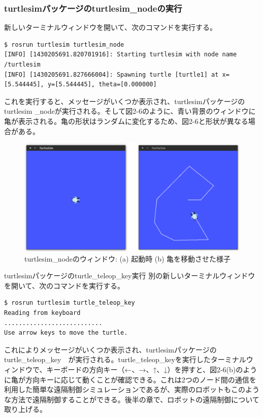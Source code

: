 \subsubsection{turtlesimパッケージのturtlesim\_nodeの実行}

新しいターミナルウィンドウを開いて、次のコマンドを実行する。

\begin{lstlisting}[language=ROS]
$ rosrun turtlesim turtlesim_node
[INFO] [1430205691.820701916]: Starting turtlesim with node name /turtlesim
[INFO] [1430205691.827666004]: Spawning turtle [turtle1] at x=[5.544445], y=[5.544445], theta=[0.000000]
\end{lstlisting}

これを実行すると、メッセージがいくつか表示され、turtlesimパッケージのturtlesim \_nodeが実行される。そして図2-6のように、青い背景のウィンドウに亀が表示される。亀の形状はランダムに変化するため、図2-6と形状が異なる場合がある。

\begin{figure}[h]
  \centering
  \includegraphics[width=0.9\columnwidth]{pictures/chapter2/pic_02_03.png}
  \caption{turtlesim\_nodeのウィンドウ: (a) 起動時 (b) 亀を移動させた様子}
\end{figure}

turtlesimパッケージのturtle\_teleop\_key実行
別の新しいターミナルウィンドウを開いて、次のコマンドを実行する。

\begin{lstlisting}[language=ROS]
$ rosrun turtlesim turtle_teleop_key
Reading from keyboard
...........................
Use arrow keys to move the turtle.
\end{lstlisting}

これによりメッセージがいくつか表示され、turtlesimパッケージのturtle\_teleop\_key　が実行される。turtle\_teleop\_keyを実行したターミナルウィンドウで、キーボードの方向キー（←、→、↑、↓）を押すと、図2-6(b)のように亀が方向キーに応じて動くことが確認できる。これは2つのノード間の通信を利用した簡単な遠隔制御シミュレーションであるが、実際のロボットもこのような方法で遠隔制御することができる。後半の章で、ロボットの遠隔制御について取り上げる。

